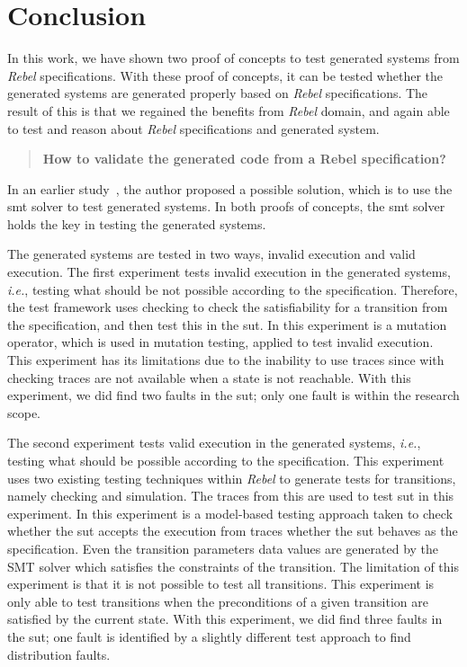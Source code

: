 \chapter{Conclusion}\label{sec:ch7}

In this work, we have shown two proof of concepts to test generated systems from
\textit{Rebel} specifications. With these proof of concepts, it can be tested
whether the generated systems are generated properly based on \textit{Rebel}
specifications. The result of this is that we regained the benefits from
\textit{Rebel} domain, and again able to test and reason about \textit{Rebel}
specifications and generated system.

\begin{quote}
  \textbf{How to validate the generated code from a Rebel specification?}
\end{quote}

In an earlier study~\cite[p.3]{stoel2015case}, the author proposed a possible
solution, which is to use the \gls{smt} solver to test generated systems.
In both proofs of concepts, the \gls{smt} solver holds the key in testing the
generated systems.

The generated systems are tested in two ways, invalid execution and valid execution.
The first experiment tests invalid execution in the generated systems, \textit{i.e.},
testing what should be not possible according to the specification.
Therefore, the test framework uses checking to check the satisfiability for a
transition from the specification, and then test this in the \gls{sut}.
In this experiment is a mutation operator, which is used in mutation testing,
applied to test invalid execution.
This experiment has its limitations due to the inability to use traces
since with checking traces are not available when a state is not reachable.
With this experiment, we did find two faults in
the \gls{sut}; only one fault is within the research scope.

The second experiment tests valid execution in the generated systems,
\textit{i.e.}, testing what should be possible according to the specification.
This experiment uses two existing testing techniques within \textit{Rebel} to
generate tests for transitions, namely checking and simulation.
The traces from this are used to test \gls{sut} in this experiment.
In this experiment is a model-based testing approach taken to check whether the
\gls{sut} accepts the execution from traces whether the \gls{sut} behaves as the
specification.
Even the transition parameters data values are generated by the SMT solver which
satisfies the constraints of the transition. The limitation of this experiment
is that it is not possible to test all transitions. This experiment is only able
to test transitions when the preconditions of a given transition are satisfied
by the current state.
With this experiment, we did find
three faults in the \gls{sut}; one fault is identified by a slightly different test
approach to find distribution faults.

